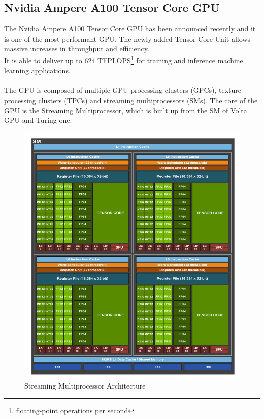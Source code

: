 \subsection{Nvidia Ampere A100 Tensor Core GPU}
The Nvidia Ampere A100 Tensor Core GPU has been announced recently and it is one of the most performant GPU. The newly added Tensor Core Unit allows massive increases in throughput and efficiency.\\It is able to deliver up to 624 TFPLOPS\footnote{floating-point operations per second} for training and inference machine learning applications.\\\\

The GPU is composed of multiple GPU processing clusters (GPCs), texture processing clusters (TPCs) and streaming multiprocessors (SMs).
The core of the GPU is the Streaming Multiprocessor, which is built up from the SM of Volta GPU and Turing one.
\begin{figure}[!htbp]
\centering
\captionsetup{justification=centering}
\includegraphics[scale=0.6]{./figure/volta_sm_arch.PNG}
\caption{Streaming Multiprocessor Architecture \cite{paper:41}}
\label{fig:voltasmarch}
\end{figure}


